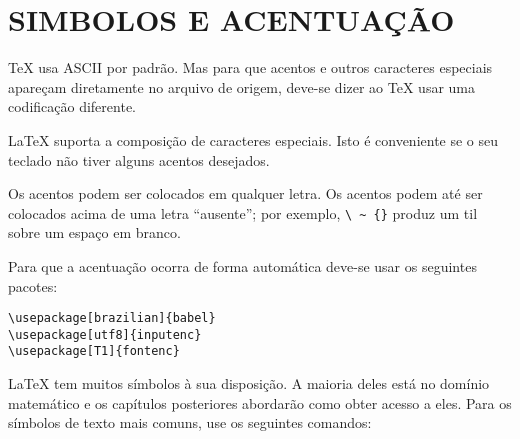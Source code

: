 
\chapter{SIMBOLOS E ACENTUAÇÃO}

\TeX{} usa ASCII por padrão. Mas para que acentos e outros caracteres especiais apareçam diretamente no arquivo de origem,
deve-se dizer ao \TeX{} usar uma codificação diferente.


\LaTeX{} suporta a composição de caracteres especiais.
Isto é conveniente se o seu teclado não tiver alguns acentos desejados.

Os acentos podem ser colocados em qualquer letra.
Os acentos podem até ser colocados acima de uma letra “ausente”; por exemplo, \verb|\ ~ {}| produz um til sobre um espaço em branco.

Para que a acentuação ocorra de forma automática deve-se usar os seguintes pacotes:

\begin{verbatim}
\usepackage[brazilian]{babel}
\usepackage[utf8]{inputenc}
\usepackage[T1]{fontenc}
\end{verbatim}

\LaTeX{} tem muitos símbolos à sua disposição.
A maioria deles está no domínio matemático e os capítulos posteriores abordarão como obter acesso a eles.
Para os símbolos de texto mais comuns, use os seguintes comandos:

